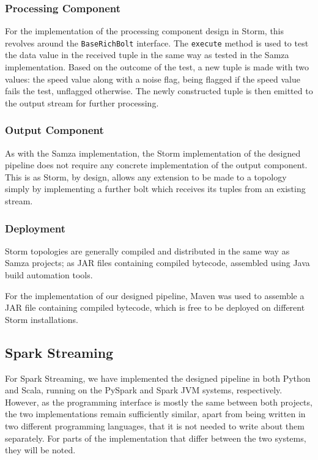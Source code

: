 \subsubsection{Processing Component}

For the implementation of the processing component design in Storm, this revolves around the \texttt{BaseRichBolt} interface.
The \texttt{execute} method is used to test the data value in the received tuple in the same way as tested in the Samza
implementation. Based on the outcome of the test, a new tuple is made with two values: the speed value along with a
noise flag, being flagged if the speed value fails the test, unflagged otherwise. The newly constructed tuple is then
emitted to the output stream for further processing.

\subsubsection{Output Component}

As with the Samza implementation, the Storm implementation of the designed pipeline does not require any concrete implementation
of the output component. This is as Storm, by design, allows any extension to be made to a topology simply by implementing
a further bolt which receives its tuples from an existing stream.

\subsubsection{Deployment}

Storm topologies are generally compiled and distributed in the same way as Samza projects; as JAR files containing compiled
bytecode, assembled using Java build automation tools.

For the implementation of our designed pipeline, Maven was used to assemble a JAR file containing compiled bytecode, which
is free to be deployed on different Storm installations.



\subsection{Spark Streaming} %
\label{ssub:impl_spark_streaming}

For Spark Streaming, we have implemented the designed pipeline in both Python and Scala, running on the PySpark and Spark
JVM systems, respectively. However, as the programming interface is mostly the same between both projects, the two
implementations remain sufficiently similar, apart from being written in two different programming languages, that it is
not needed to write about them separately. For parts of the implementation that differ between the two systems, they
will be noted.

